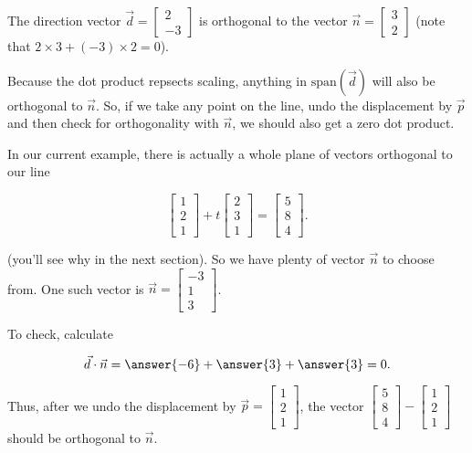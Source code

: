 \documentclass{ximera}
\begin{document}
\begin{example}
  The direction vector $\vec{d}=\begin{bmatrix}
    2\\-3
  \end{bmatrix}$ is orthogonal to the vector $\vec{n}=\begin{bmatrix}
    3\\2
  \end{bmatrix}$ (note that $2\times 3+(-3)\times 2=0$).

  Because the dot product repsects scaling, anything in $\mbox{span}(\vec{d})$ will also be orthogonal to $\vec{n}$. So, if we take any point on the line, undo the displacement by $\vec{p}$ and then check for orthogonality with $\vec{n}$, we should also get a zero dot product.

  In our current example, there is actually a whole plane of vectors orthogonal to our line 

  \begin{equation*}
    \begin{bmatrix} 1 \\ 2 \\ 1 \end{bmatrix}
    + t \begin{bmatrix} 2 \\ 3 \\ 1 \end{bmatrix}
    = \begin{bmatrix} 5 \\ 8 \\ 4 \end{bmatrix}.
  \end{equation*}

  (you'll see why in the next section). So we have plenty of vector $\vec{n}$ to choose from. One such vector is $\vec{n}=\begin{bmatrix}
    -3\\1\\3
  \end{bmatrix}$. 
  
  To check, calculate 

  $$\vec{d}\cdot \vec{n}=\answer{-6}+\answer{3}+\answer{3}=0.$$

  Thus, after we undo the displacement by $\vec{p}=\begin{bmatrix}
    1\\2\\1
  \end{bmatrix}$, the vector $\begin{bmatrix}
    5\\8\\4
  \end{bmatrix}-\begin{bmatrix}
    1\\2\\1
  \end{bmatrix}$ should be orthogonal to $\vec{n}$.


\end{example}
\end{document}
